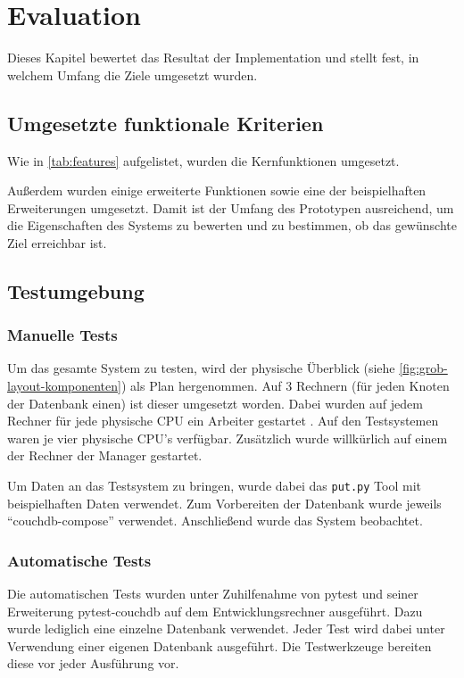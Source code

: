 \chapter{Evaluation}
\label{cha:eval}
Dieses Kapitel bewertet das Resultat der Implementation und
stellt fest, in welchem Umfang die Ziele umgesetzt wurden.

\section{Umgesetzte funktionale Kriterien}
\label{sec:eval:features}
Wie in \cref{tab:features} aufgelistet,
wurden die Kernfunktionen umgesetzt.

    

Außerdem wurden einige erweiterte Funktionen sowie eine der beispielhaften Erweiterungen umgesetzt.
Damit ist der Umfang des Prototypen ausreichend, um die Eigenschaften des Systems zu bewerten und zu bestimmen, ob das gewünschte Ziel erreichbar ist.


\section{Testumgebung}
\label{sec:eval:Testumgebung}

\subsection{Manuelle Tests}
Um das gesamte System zu testen, wird der physische Überblick (siehe \cref{fig:grob-layout-komponenten}) als Plan hergenommen.
Auf 3 Rechnern (für jeden Knoten der Datenbank einen) ist dieser umgesetzt worden.
Dabei wurden auf jedem Rechner für jede physische CPU ein Arbeiter gestartet .
Auf den Testsystemen waren je vier physische CPU's verfügbar.
Zusätzlich wurde willkürlich auf einem der Rechner der Manager gestartet.

Um Daten an das Testsystem zu bringen, wurde dabei das \verb|put.py| Tool mit beispielhaften Daten verwendet.
Zum Vorbereiten der Datenbank wurde jeweils ``couchdb-compose'' \cite{couchdb:compose} verwendet.
Anschließend wurde das System beobachtet.

\subsection{Automatische Tests}
Die automatischen Tests wurden unter Zuhilfenahme von pytest \cite{pytest:website} und seiner Erweiterung  pytest-couchdb \cite{pytest:couchdbkit} auf dem Entwicklungsrechner  ausgeführt.
Dazu wurde lediglich eine einzelne Datenbank verwendet.
Jeder Test wird dabei unter Verwendung einer eigenen Datenbank ausgeführt.
Die Testwerkzeuge bereiten diese vor jeder Ausführung vor.

